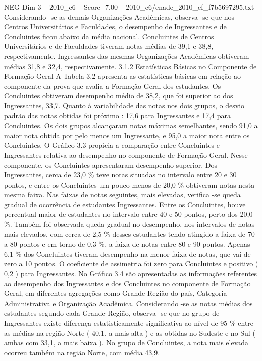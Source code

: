 \begin{textsample}{NEG Dim 3 – 2010\_c6 – Score -7.00 – 2010\_c6/enade\_2010\_ef\_f7b5697295.txt}
Considerando -se as demais Organizações Acadêmicas, observa -se que nos Centros Universitários e Faculdades, o desempenho de Ingressantes e de Concluintes ficou abaixo da média nacional.
Concluintes de Centros Universitários e de Faculdades tiveram notas médias de 39,1 e 38,8, respectivamente.
Ingressantes das mesmas Organizações Acadêmicas obtiveram médias 31,8 e 32,4, respectivamente. 3.1.2 Estatísticas Básicas no Componente de Formação Geral A Tabela 3.2 apresenta as estatísticas básicas em relação ao componente da prova que avalia a Formação Geral dos estudantes.
Os Concluintes obtiveram desempenho médio de 38,2, que foi superior ao dos Ingressantes, 33,7.
Quanto à variabilidade das notas nos dois grupos, o desvio padrão das notas obtidas foi próximo : 17,6 para Ingressantes e 17,4 para Concluintes.
Os dois grupos alcançaram notas máximas semelhantes, sendo 91,0 a maior nota obtida por pelo menos um Ingressante, e 95,0 a maior nota entre os Concluintes.
O Gráfico 3.3 propicia a comparação entre Concluintes e Ingressantes relativa ao desempenho no componente de Formação Geral.
Nesse componente, os Concluintes apresentaram desempenho superior.
Dos Ingressantes, cerca de 23,0 \% teve notas situadas no intervalo entre 20 e 30 pontos, e entre os Concluintes um pouco menos de 20,0 \% obtiveram notas nesta mesma faixa.
Nas faixas de notas seguintes, mais elevadas, verifica -se queda gradual de ocorrência de estudantes Ingressantes.
Entre os Concluintes, houve percentual maior de estudantes no intervalo entre 40 e 50 pontos, perto dos 20,0 \%.
Também foi observada queda gradual no desempenho, nos intervalos de notas mais elevados, com cerca de 2,5 \% desses estudantes tendo atingido a faixa de 70 a 80 pontos e em torno de 0,3 \%, a faixa de notas entre 80 e 90 pontos.
Apenas 6,1 \% dos Concluintes tiveram desempenho na menor faixa de notas, que vai de zero a 10 pontos.
O coeficiente de assimetria foi zero para Concluintes e positivo ( 0,2 ) para Ingressantes.
No Gráfico 3.4 são apresentadas as informações referentes ao desempenho dos Ingressantes e dos Concluintes no componente de Formação Geral, em diferentes agregações como Grande Região do país, Categoria Administrativa e Organização Acadêmica.
Considerando -se as notas médias dos estudantes segundo cada Grande Região, observa -se que no grupo de Ingressantes existe diferença estatisticamente significativa ao nível de 95 \% entre as médias na região Norte ( 40,1, a mais alta ) e as obtidas no Sudeste e no Sul ( ambas com 33,1, a mais baixa ).
No grupo de Concluintes, a nota mais elevada ocorreu também na região Norte, com média 43,9.

\end{textsample}
